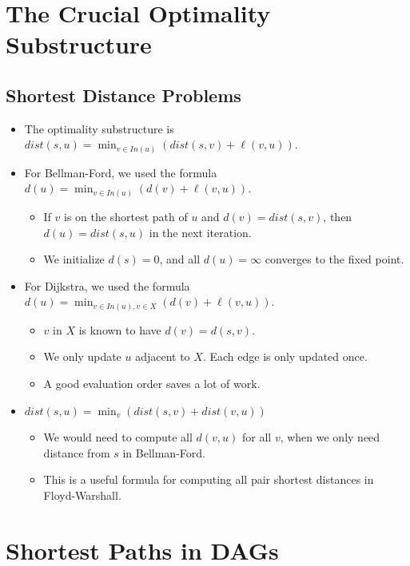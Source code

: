 
\section{The Crucial Optimality Substructure}

\subsection{Shortest Distance Problems}
\begin{itemize}
    \item The optimality substructure is $dist(s, u) = \min_{v \in In(u)}(dist(s, v) + \ell(v, u))$.
    \item For Bellman-Ford, we used the formula $d(u) = \min_{v \in In(u)}(d(v) + \ell(v, u))$.
    \begin{itemize}
        \item If $v$ is on the shortest path of $u$ and $d(v) = dist(s, v)$, then $d(u) = dist(s, u)$ in the next iteration.
        \item We initialize $d(s) = 0$, and all $d(u) = \infty$ converges to the fixed point.
    \end{itemize}
    \item For Dijkstra, we used the formula $d(u) = \min_{v \in In(u), v \in X}(d(v) + \ell(v, u))$.
    \begin{itemize}
        \item $v$ in $X$ is known to have $d(v) = d(s, v)$.
        \item We only update $u$ adjacent to $X$. Each edge is only updated once.
        \item A good evaluation order saves a lot of work.
    \end{itemize}
    \item $dist(s, u) = \min_v(dist(s, v) + dist(v, u))$
    \begin{itemize}
        \item We would need to compute all $d(v, u)$ for all $v$, when we only need distance from $s$ in Bellman-Ford.
        \item This is a useful formula for computing all pair shortest distances in Floyd-Warshall.
    \end{itemize}
\end{itemize}

\section{Shortest Paths in DAGs}

